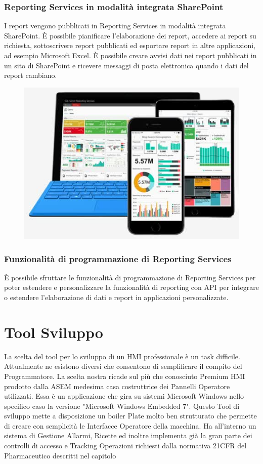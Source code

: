 \documentclass[12pt, a4paper, oneside]{book}
\begin{document}
\subsubsection{Reporting Services in modalità integrata SharePoint}
I report vengono pubblicati in Reporting Services in modalità integrata SharePoint. È possibile pianificare l'elaborazione dei report, accedere ai report su richiesta, sottoscrivere report pubblicati ed esportare report in altre applicazioni, ad esempio Microsoft Excel. È possibile creare avvisi dati nei report pubblicati in un sito di SharePoint e ricevere messaggi di posta elettronica quando i dati del report cambiano.

\begin{figure}[H]
	\centering
	\includegraphics[width=13cm]{Immagini/REP1}
	\caption{}
	\label{REP1}
\end{figure}

\subsubsection{Funzionalità di programmazione di Reporting Services }
È possibile sfruttare le funzionalità di programmazione di Reporting Services per poter estendere e personalizzare la funzionalità di reporting con API per integrare o estendere l'elaborazione di dati e report in applicazioni personalizzate.

\section{Tool Sviluppo}
La scelta del tool per lo sviluppo di un HMI professionale è un task difficile. Attualmente ne esistono diversi che consentono di semplificare il compito del Programmatore. 
La scelta nostra ricade sul più che conosciuto Premium HMI prodotto dalla ASEM medesima casa costruttrice dei Pannelli Operatore utilizzati. Essa è un applicazione che gira su sistemi Microsoft Windows nello specifico caso la versione "Microsoft Windows Embedded 7".
Questo Tool di sviluppo mette a disposizione un boiler Plate molto ben strutturato che permette di creare con semplicità le Interfacce Operatore della macchina. Ha all'interno un sistema di Gestione Allarmi, Ricette ed inoltre implementa già la gran parte dei controlli di accesso e Tracking Operazioni richiesti dalla normativa 21CFR del Pharmaceutico descritti nel capitolo \cite{CFR}
\end{document}
